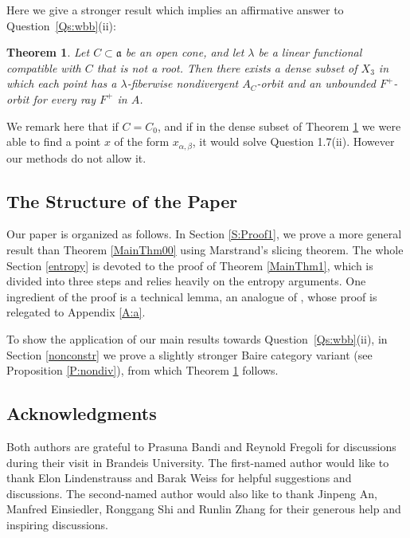 \documentclass[reqno,12pt]{amsart}
\newtheorem{theorem}{Theorem}[section]
\theoremstyle{definition}
\numberwithin{equation}{section}
\newcommand{\cL}{\mathcal{L}}
\newcommand {\ignore}[1]  {}
\newcommand {\comm}[1]   {\textcolor{red}{#1}}
\begin{document}
{Here we give a stronger result which implies an affirmative answer to Question~\ref{Qs:wbb}(ii):
\begin{theorem}\label{Main:ans0}
Let $C\subset\mathfrak{a}$ be an open cone\ignore{which is not a half-plane}, and let 
$\lambda$ be a linear functional compatible with $C$ that is not a root. %
Then there exists a dense subset of $X_3$ in which each point has a $\lambda$-fiberwise nondivergent $A_C$-orbit and an unbounded $F^+$-orbit for every ray $F^+$ in $A$.
\end{theorem}
We remark here that if $C=C_0$, and if in the dense subset of Theorem \ref{Main:ans0} we were able to find a point $x$ of the form $x_{\alpha,\beta}$, it would solve Question 1.7(ii). However our methods do not allow it. 
}


\subsection{The Structure of the Paper} Our paper is organized as follows. In Section \ref{S:Proof1}, we prove a more general result than Theorem \ref{MainThm00} using Marstrand's slicing theorem. The whole Section \ref{entropy} is devoted to the proof of Theorem \ref{MainThm1}, which is divided into three steps and relies heavily on the entropy arguments.
One ingredient of the proof is a technical lemma, an analogue of \cite[Proposition 2.4]{bet15}, whose proof is relegated to Appendix \ref{A:a}. 

To show the application of our main results towards Question~\ref{Qs:wbb}(ii), in Section \ref{nonconstr} we prove a slightly stronger Baire category variant (see Proposition \ref{P:nondiv}), from which Theorem \ref{Main:ans0} follows. 

 \subsection*{Acknowledgments}
Both authors are grateful to Prasuna Bandi and Reynold Fregoli for discussions during their visit in Brandeis University. The first-named author would like to thank Elon Lindenstrauss and Barak Weiss for helpful suggestions and discussions. The second-named author would also like to thank Jinpeng An, Manfred Einsiedler, Ronggang Shi and Runlin Zhang for their generous help and inspiring discussions. 
\end{document}
